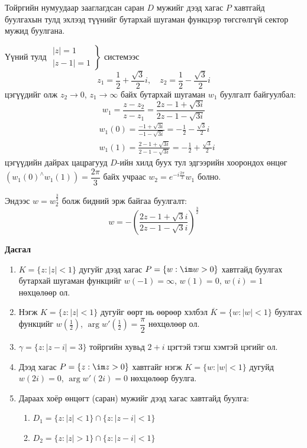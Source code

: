 \begin{sol}
Тойргийн нумуудаар зааглагдсан саран $D$ мужийг дээд хагас $P$ хавтгайд буулгахын тулд эхлээд түүнийг бутархай шугаман функцээр төгсгөлгүй сектор мужид буулгана.  

Үүний тулд
$\left.\begin{array}{c}
     |z|=1  \\
     |z-1|=1
\end{array}\right\}$ системээс
$$z_1=\frac{1}{2}+\frac{\sqrt{3}}{2}i, \quad z_2=\frac{1}{2}-\frac{\sqrt{3}}{2}i$$
цэгүүдийг олж $z_2\rightarrow 0$, $z_1\rightarrow \infty$ байх бутархай шугаман $w_1$ буулгалт байгуулбал:
$$w_1=\frac{z-z_2}{z-z_1}=\frac{2z-1+\sqrt{3i}}{2z-1-\sqrt{3i}}$$
\begin{align*}
    &w_1(0)=\frac{-1+\sqrt{3i}}{-1-\sqrt{3i}}=-\frac{1}{2}-\frac{\sqrt{3}}{2}i\\
    &w_1(1)=\frac{2-1+\sqrt{3i}}{2-1-\sqrt{3i}}=-\frac{1}{2}+\frac{\sqrt{3}}{2}i
\end{align*}
цэгүүдийн дайрах цацрагууд $D$-ийн хилд буух тул эдгээрийн хоорондох өнцөг $(w_1(0)^{\wedge}w_1(1))=\dfrac{2\pi}{3}$ байх учраас $w_2=e^{-i\frac{2\pi}{3}}w_1$ болно.

Эндээс $w=w_2^{\frac{3}{2}}$ болж бидний эрж байгаа буулгалт:
$$w=-\left(\frac{2z-1+\sqrt{3}i}{2z-1-\sqrt{3}i}\right)^{\frac{3}{2}}$$
\end{sol}
\begin{center}
    \textbf{Дасгал}
\end{center}
\begin{enumerate}
    \item $K=\{z:|z|<1\}$ дугуйг дээд хагас $P=\{w:\im w>0\}$ хавтгайд буулгах бутархай шугаман функцийг $w(-1)=\infty$, $w(1)=0$, $w(i)=1$ нөхцөлөөр ол.
    \item Нэгж $K=\{z:|z|<1\}$ дугуйг өөрт нь өөрөөр хэлбэл
$\overline{K}=\{w:|w|<1\}$ буулгах функцийг $w\left(\frac{1}{2}\right)$, $\arg  w'\left(\frac{1}{2}\right)=\dfrac{\pi}{2}$ нөхцөлөөр ол.
\item $\gamma=\{z:|z-i|=3\}$ тойргийн хувьд $2+i$ цэгтэй тэгш
хэмтэй цэгийг ол.
\item Дээд хагас $P=\{z:\im z>0\}$ хавтгайг нэгж $K=\{w:|w|<1\}$ дугуйд $w(2i)=0$, $\arg  w'(2i)=0$ нөхцөлөөр буулга.
\item 	Дараах хоёр өнцөгт (саран) мужийг дээд хагас хавтгайд буулга:
\begin{enumerate}
    \item [a)] $D_1=\{z:|z|<1\}\cap \{z:|z-i|<1\}$
     \item [b)] $D_2=\{z:|z|>1\}\cap \{z:|z-i|<1\}$
\end{enumerate}
\end{enumerate}
